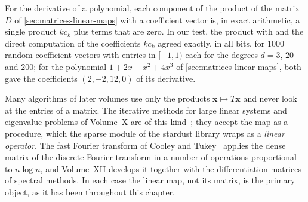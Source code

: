 \begin{table}
\end{table}

For the derivative of a polynomial, each component of the product of the matrix $D$ of \cref{sec:matrices-linear-maps} with a coefficient vector is, in exact arithmetic, a single product $kc_k$ plus terms that are zero. In our test, the product with  and the direct computation of the coefficients $kc_k$ agreed exactly, in all bits, for $1000$ random coefficient vectors with entries in $[-1,1)$ each for the degrees $d=3$, $20$ and $200$; for the polynomial $1+2x-x^2+4x^3$ of \cref{sec:matrices-linear-maps}, both gave the coefficients $(2,-2,12,0)$ of its derivative.

Many algorithms of later volumes use only the products $\mathbf x\mapsto T\mathbf x$ and never look at the entries of a matrix. The iterative methods for large linear systems and eigenvalue problems of Volume~X are of this kind~\cite{saad2003}; they accept the map as a procedure, which the sparse module of the stardust library wraps as a \emph{linear operator}. The fast Fourier transform of Cooley and Tukey~\cite{cooley1965} applies the dense matrix of the discrete Fourier transform in a number of operations proportional to $n\log n$, and Volume~XII develops it together with the differentiation matrices of spectral methods. In each case the linear map, not its matrix, is the primary object, as it has been throughout this chapter.

